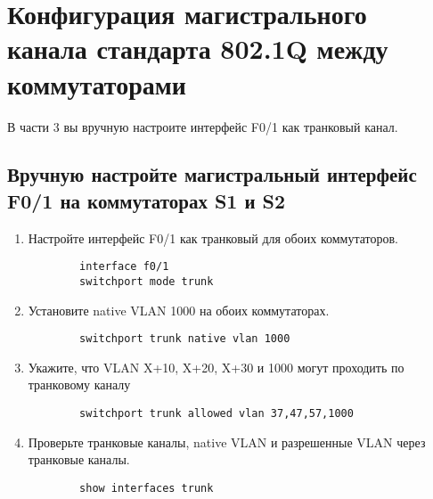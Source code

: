 \section{Конфигурация магистрального канала стандарта 802.1Q между коммутаторами}
В части 3 вы вручную настроите интерфейс F0/1 как транковый канал.

\subsection{Вручную настройте магистральный интерфейс F0/1 на коммутаторах S1 и S2}
\begin{enumerate}[a]
    \item Настройте интерфейс F0/1 как транковый для обоих коммутаторов.
    \begin{verbatim}
        interface f0/1
        switchport mode trunk
    \end{verbatim}

    \item Установите native VLAN 1000 на обоих коммутаторах.
    \begin{verbatim}
        switchport trunk native vlan 1000
    \end{verbatim}

    \item Укажите, что VLAN X+10, X+20, X+30 и 1000 могут проходить по транковому каналу
    \begin{verbatim}
        switchport trunk allowed vlan 37,47,57,1000
    \end{verbatim}

    \item Проверьте транковые каналы, native VLAN и разрешенные VLAN через транковые каналы.
    \begin{verbatim}
        show interfaces trunk
    \end{verbatim}
\end{enumerate}



